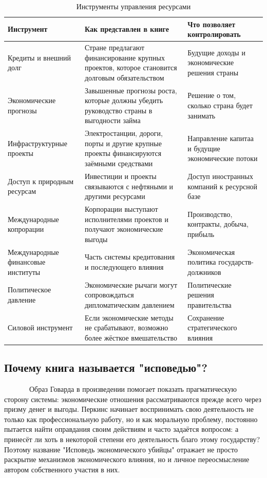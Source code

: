 \documentclass[12pt]{article}
\begin{document}
\begin{table}[H]
\centering
\begin{tabularx}{\textwidth}{|p{4cm}|X|p{3cm}|}
\hline
Инструмент & Как представлен в книге & Что позволяет контролировать\\ \hline
Кредиты и внешний долг & Стране предлагают финансирование крупных проектов, которое становится долговым обязательством & Будущие доходы и экономические решения страны \\ \hline
Экономические прогнозы & Завышенные прогнозы роста, которые должны убедить руководство страны в выгодности займа & Решение о том, сколько страна будет занимать \\ \hline
Инфраструктурные проекты & Электростанции, дороги, порты и другие крупные проекты финансируются заёмными средствами & Направление капитаа и будущие экономические потоки  \\ \hline
Доступ к природным ресурсам & Инвестиции и проекты связываются с нефтяными и другими ресурсами & Доступ иностранных компаний к ресурсной базе \\ \hline
Международные копрорации & Корпорации выступают исполнителями проектов и получают экономические выгоды & Производство, контракты, добыча, прибыль \\ \hline
Международные финансовые институты & Часть системы кредитования и последующего влияния & Экономическая политика государств-должников \\ \hline
Политическое давление & Экономические рычаги могут сопровождаться дипломатическим давлением & Политические решения правительства \\ \hline
Силовой инструмент & Если экономические методы не срабатывают, возможно более жёсткое вмешательство  & Сохранение стратегического влияния \\ \hline
\end{tabularx} 
\caption{Инструменты управления ресурсами}
\end{table}

\subsection{Почему книга называется "исповедью"?}
\ \ \ \ \ \ \ Образ Говарда в произведении помогает показать прагматическую сторону системы: экономические отношения рассматриваются прежде всего через призму денег и выгоды. Перкинс начинает воспринимать свою деятельность не только как профессиональную работу, но и как моральную проблему, постоянно пытается найти оправдания своим действиям и часто задаётся вопросом: а принесёт ли хоть в некоторой степени его деятельность благо этому государству? Поэтому название "Исповедь экономического убийцы" отражает не просто раскрытие механизмов экономического влияния, но и личное переосмысление автором собственного участия в них.
\end{document}
